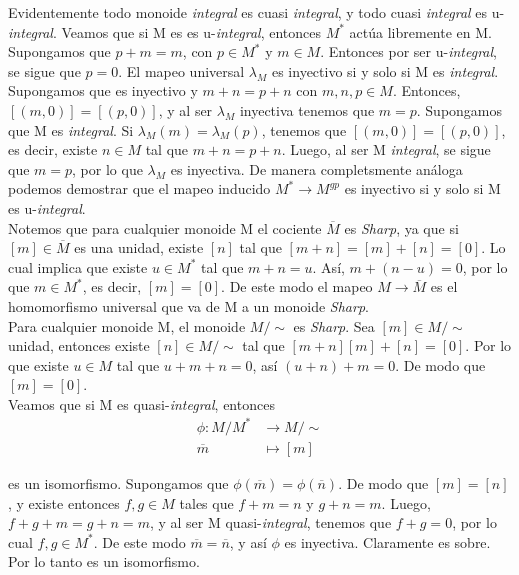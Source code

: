 \documentclass[12pt,spanish]{amsart}
\theoremstyle{definition}
\theoremstyle{remark}
\begin{document}
Evidentemente todo monoide \textit{integral} es cuasi \textit{integral}, y todo cuasi \textit{integral} es u-\textit{integral}. Veamos que si M es es u-\textit{integral}, entonces $M^{\ast}$ actúa libremente en M. Supongamos que $p+m=m$, con $p\in M^{\ast}$ y $m\in M$. Entonces por ser u-\textit{integral}, se sigue que $p=0$. El mapeo universal $\lambda_{M}$ es inyectivo si y solo si M es \textit{integral}. Supongamos que es inyectivo y $m+n=p+n$ con $m,n,p\in M$. Entonces, $[(m,0)]=[(p,0)]$, y al ser $\lambda_{M}$ inyectiva tenemos que $m=p$. Supongamos que M es \textit{integral}. Si $\lambda_{M}(m)=\lambda_{M}(p)$, tenemos que $[(m,0)]=[(p,0)]$, es decir, existe $n\in M$ tal que $m+n=p+n$. Luego, al ser M \textit{integral}, se sigue que $m=p$, por lo que $\lambda_{M}$ es inyectiva. De manera completsmente análoga podemos demostrar que el mapeo inducido $M^{\ast} \to M^{gp}$ es inyectivo si y solo si M es u-\textit{integral}. \\
Notemos que para cualquier monoide M el cociente $\overline{M}$ es \textit{\textit{Sharp}}, ya que si $[m]\in \overline{M}$ es una unidad, existe $[n]$ tal que $[m+n]=[m]+[n]=[0]$. Lo cual implica que existe $u\in M^{\ast}$ tal que $m+n=u$. Así, $m+(n-u)=0$, por lo que $m\in M^{\ast}$, es decir, $[m]=[0]$. De este modo el mapeo $M \to \overline{M}$ es el homomorfismo universal que va de M a un monoide \textit{\textit{Sharp}}. \\
Para cualquier monoide M, el monoide $M/ \sim$ es \textit{Sharp}. Sea $[m]\in M/ \sim$ unidad, entonces existe $[n]\in M/ \sim$ tal que $[m+n][m]+[n]=[0]$. Por lo que existe $u\in M$ tal que $u+m+n=0$, así $(u+n)+m=0$. De modo que $[m]=[0]$.  \\
Veamos que si M es quasi-\textit{integral}, entonces 
\begin{equation*}
\begin{split}
\phi:M/M^{\ast} &\to M/ \sim \\
\overline{m} &\mapsto [m]
\end{split}
\end{equation*}
 
es un isomorfismo. Supongamos que $\phi(\overline{m})=\phi(\overline{n})$. De modo que $[m]=[n]$, y existe entonces $f,g\in M$ tales que $f+m=n$ y $g+n=m$. Luego, $f+g+m=g+n=m$, y al ser M quasi-\textit{integral}, tenemos que $f+g=0$, por lo cual $f,g\in M^{\ast}$. De este modo $\overline{m}=\overline{n}$, y así $\phi$ es inyectiva. Claramente es sobre. Por lo tanto es un isomorfismo. 
\end{document}

